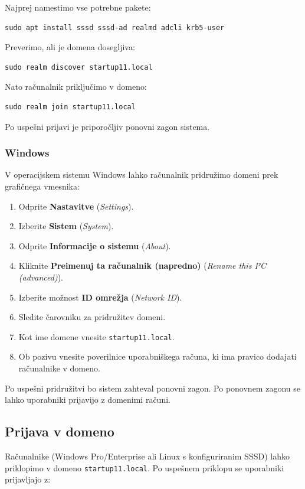 \documentclass[a4paper,11pt]{article}
\begin{document}
Najprej namestimo vse potrebne pakete:
\begin{lstlisting}
sudo apt install sssd sssd-ad realmd adcli krb5-user
\end{lstlisting}

Preverimo, ali je domena dosegljiva:
\begin{lstlisting}
sudo realm discover startup11.local
\end{lstlisting}

Nato računalnik priključimo v domeno:
\begin{lstlisting}
sudo realm join startup11.local
\end{lstlisting}

Po uspešni prijavi je priporočljiv ponovni zagon sistema.

\subsubsection{Windows}

V operacijskem sistemu Windows lahko računalnik pridružimo domeni prek grafičnega vmesnika:

\begin{enumerate}
    \item Odprite \textbf{Nastavitve} (\textit{Settings}).
    \item Izberite \textbf{Sistem} (\textit{System}).
    \item Odprite \textbf{Informacije o sistemu} (\textit{About}).
    \item Kliknite \textbf{Preimenuj ta računalnik (napredno)} (\textit{Rename this PC (advanced)}).
    \item Izberite možnost \textbf{ID omrežja} (\textit{Network ID}).
    \item Sledite čarovniku za pridružitev domeni.
    \item Kot ime domene vnesite \texttt{startup11.local}.
    \item Ob pozivu vnesite poverilnice uporabniškega računa, ki ima pravico dodajati računalnike v domeno.
\end{enumerate}

Po uspešni pridružitvi bo sistem zahteval ponovni zagon. Po ponovnem zagonu se lahko uporabniki prijavijo z domenimi računi.


\subsection{Prijava v domeno}
Računalnike (Windows Pro/Enterprise ali Linux s konfiguriranim SSSD) lahko priklopimo v domeno \texttt{startup11.local}. Po uspešnem priklopu se uporabniki prijavljajo z:
\end{document}
